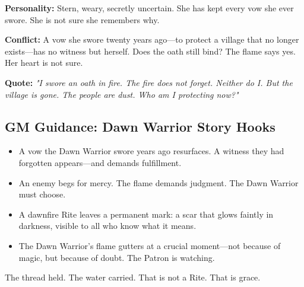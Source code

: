 \textbf{Personality:} Stern, weary, secretly uncertain. She has kept every vow she ever swore. She is not sure she remembers why.

\textbf{Conflict:} A vow she swore twenty years ago—to protect a village that no longer exists—has no witness but herself. Does the oath still bind? The flame says yes. Her heart is not sure.

\textbf{Quote:} \textit{"I swore an oath in fire. The fire does not forget. Neither do I. But the village is gone. The people are dust. Who am I protecting now?"}

\subsection{GM Guidance: Dawn Warrior Story Hooks}

\begin{itemize}
\item A vow the Dawn Warrior swore years ago resurfaces. A witness they had forgotten appears—and demands fulfillment.
\item An enemy begs for mercy. The flame demands judgment. The Dawn Warrior must choose.
\item A dawnfire Rite leaves a permanent mark: a scar that glows faintly in darkness, visible to all who know what it means.
\item The Dawn Warrior's flame gutters at a crucial moment—not because of magic, but because of doubt. The Patron is watching.
\end{itemize}

The thread held. The water carried. That is not a Rite. That is grace.
